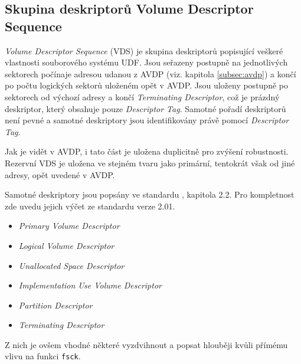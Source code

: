 \subsection{Skupina deskriptorů Volume Descriptor Sequence}
\label{subsec:vds}
\textit{Volume Descriptor Sequence} (VDS) je skupina deskriptorů popisující veškeré vlastnosti souborového systému UDF. Jsou seřazeny postupně na jednotlivých sektorech počínaje adresou udanou z AVDP (viz. kapitola \ref{subsec:avdp}) a končí po počtu logických sektorů uloženém opět v AVDP. Jsou uloženy postupně po sektorech od výchozí adresy a končí \textit{Terminating Descriptor}, což je prázdný deskriptor, který obsahuje pouze \textit{Descriptor Tag}. Samotné pořadí deskriptorů není pevné a samotné deskriptory jsou identifikovány právě pomocí \textit{Descriptor Tag}.

Jak je vidět v AVDP, i tato část je uložena duplicitně pro zvýšení robustnosti. Rezervní VDS je uložena ve stejném tvaru jako primární, tentokrát však od jiné adresy, opět uvedené v AVDP.

Samotné deskriptory jsou popsány ve standardu \cite{osta-udf-0201}, kapitola 2.2. Pro kompletnost zde uvedu jejich výčet ze standardu verze 2.01.
\begin{itemize}
    \item \textit{Primary Volume Descriptor}
    \item \textit{Logical Volume Descriptor}
    \item \textit{Unallocated Space Descriptor}
    \item \textit{Implementation Use Volume Descriptor}
    \item \textit{Partition Descriptor}
    \item \textit{Terminating Descriptor}
\end{itemize}
Z nich je ovšem vhodné některé vyzdvihnout a popsat hlouběji kvůli přímému vlivu na funkci \texttt{fsck}.

